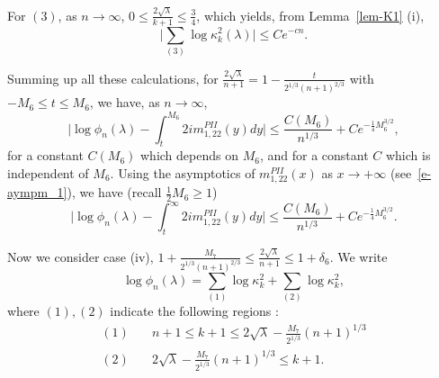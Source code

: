 \documentclass{amsart}
\theoremstyle{definition}
\theoremstyle{remark}
\numberwithin{equation}{section}
\begin{document}
\medskip
For $(3)$, as $n\to\infty$,  $0\le \frac{2\sqrt\lambda}{k+1} \le \frac34$, 
which yields, from Lemma~\ref{lem-K1} (i), 
\begin{equation*}
   \bigl| \sum_{(3)} \log{\kappa^2_{k}(\lambda)} \bigr| \le Ce^{-cn}.
\end{equation*}

Summing up all these calculations, for 
$\frac{2\sqrt{\lambda}}{n+1} = 1- \frac{t}{2^{1/3}{(n+1)}^{2/3}}$ 
with $-M_6\le t\le M_6$, we have, as $n\to\infty$, 
\begin{equation*}
  \bigl| \log{\phi_n(\lambda)} - \int_{t}^{M_6} 2im^{PII}_{1,22}(y) dy \bigr|
\le \frac{C(M_6)}{n^{1/3}}+Ce^{-\frac14M_6^{3/2}}, 
\end{equation*}
for a constant $C(M_6)$ which depends on $M_6$, and for a 
constant $C$ which is independent of $M_6$. 
Using the asymptotics of $m^{PII}_{1,22}(x)$ as 
$x\rightarrow +\infty$ (see~\eqref{e-aympm_1}), we have 
(recall $\frac12 M_6\geq 1$) 
\begin{equation}
  \bigl| \log{\phi_n(\lambda)} - \int_{t}^{\infty} 2im^{PII}_{1,22}(y) dy \bigr|
\le \frac{C(M_6)}{n^{1/3}}+Ce^{-\frac14M_6^{3/2}}. 
\end{equation}


\bigskip
Now we consider case (iv), 
$1+\frac{M_7}{2^{1/3}{(n+1)}^{2/3}} \le 
\frac{2\sqrt{\lambda}}{n+1} \le 1+\delta_6$.
We write 
\begin{equation*}
     \log{\phi_n(\lambda)} 
     =\sum_{(1)} \log{\kappa^2_{k}} + \sum_{(2)} \log{\kappa^2_{k}},
\end{equation*}
where $(1),(2)$ indicate the following regions : 
\begin{align*}
  (1)\quad  &n+1\le k+1 \le 2\sqrt\lambda - \frac{M_7}{2^{1/3}}(n+1)^{1/3}\\ 
  (2)\quad  &2\sqrt\lambda - \frac{M_7}{2^{1/3}}(n+1)^{1/3}\leq k+1.
\end{align*}
\end{document}
